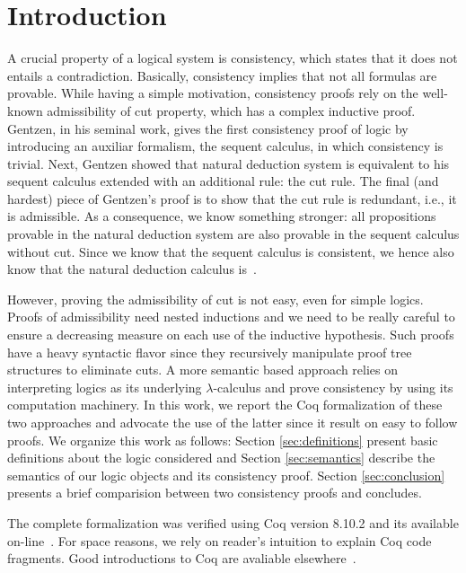\begin{coqdoccode}
\coqdocemptyline
\coqdocemptyline
\end{coqdoccode}
\section{Introduction}


A crucial property of a logical system is consistency, which states that it does not
entails a contradiction. Basically, consistency implies that not all formulas
are provable.  While having a simple motivation, consistency proofs rely on
the well-known admissibility of cut property, which has a complex inductive proof.
Gentzen, in his seminal work, gives the first consistency proof of logic by introducing an
auxiliar formalism, the sequent calculus, in which consistency is trivial. Next, Gentzen showed
that natural deduction system is equivalent to his sequent calculus extended with an
additional rule: the cut rule. The final (and hardest) piece of Gentzen's proof is to 
show that the cut rule is redundant, i.e., it is admissible. As a consequence, we know
something stronger: all propositions provable in the natural deduction system are also provable
in the sequent calculus without cut. Since we know that the sequent calculus is consistent,
we hence also know that the natural deduction calculus is~\cite{Negri2001}.


However, proving the admissibility of cut is not easy, even for simple logics.
Proofs of admissibility need nested inductions and we need to be really careful to
ensure a decreasing measure on each use of the inductive hypothesis. Such proofs have
a heavy syntactic flavor since they recursively manipulate proof tree structures to
eliminate cuts. A more semantic based approach relies on interpreting logics as its
underlying $\lambda$-calculus and prove consistency by using its computation machinery.
In this work, we report the Coq formalization of these two approaches and advocate the use
of the latter since it result on easy to follow proofs. We organize this work
as follows: Section \ref{sec:definitions} present basic definitions about the logic considered
and Section \ref{sec:semantics} describe the semantics of our logic objects and its
consistency proof. Section \ref{sec:conclusion} presents a brief comparision between
two consistency proofs and concludes.


The complete formalization was verified using Coq version 8.10.2 and its available
on-line~\cite{Sasdelli20}. For space reasons, we rely on reader's intuition to
explain Coq code fragments. Good introductions to Coq are avaliable elsewhere~\cite{Chlipala13}.


